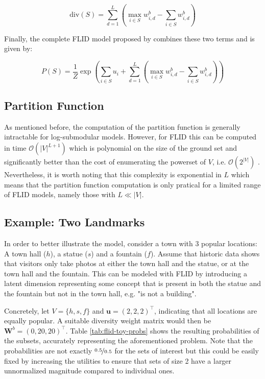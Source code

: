 \begin{equation}
  \label{eq:diversity}
  \mathrm{div}(S) = \sum_{d=1}^{L}\left(\max_{i \in S}{w^{b}_{i, d}} - \sum_{i \in S}{w^{b}_{i,d}}\right)
\end{equation}

Finally, the complete FLID model proposed by \citet{tschiatschek16learning} combines these two terms and is given by:

\begin{equation}
  \tag{FLID}
  P(S) = \frac{1}{Z}\exp{\left(\sum_{i \in S}u_{i} + \sum_{d=1}^{L}\left(\max_{i \in S}{w^{b}_{i, d}} - \sum_{i \in S}{w^{b}_{i,d}}\right)\right)}
  \label{eq:flid}
\end{equation}

\subsection{Partition Function}
\label{sec:flid-z}

As mentioned before, the computation of the partition function is generally intractable for log-submodular models. However, for FLID this can be computed in time $\mathcal{O}(|V|^{L+1})$ which is polynomial on the size of the ground set and significantly better than the cost of enumerating the powerset of $V$, i.e. $\mathcal{O}(2^{|V|})$ \citep{tschiatschek16learning}. Nevertheless, it is worth noting that this complexity is exponential in $L$ which means that the partition function computation is only pratical for a limited range of FLID models, namely those with $L \ll |V|$.

\subsection{Example: Two Landmarks}
\label{sec:flid-toy}

In order to better illustrate the model, consider a town with 3 popular locations: A town hall ($h$), a statue ($s$) and a fountain ($f$). Assume that historic data shows that visitors only take photos at either the town hall and the statue, or at the town hall and the fountain. This can be modeled with FLID by introducing a latent dimension representing some concept that is present in both the statue and the fountain but not in the town hall, e.g. "is not a building".

Concretely, let $V = \{h, s, f\}$ and $\mathbf{u} = \left(2, 2, 2\right)^{\intercal}$, indicating that all locations are equally popular. A suitable diversity weight matrix would then be $\mathbf{W}^{b} = \left(0, 20, 20\right)^{\intercal}$. Table \ref{tab:flid-toy-probs} shows the resulting probabilities of the subsets, accurately representing the aforementioned problem. Note that the probabilities are not exactly $\nicefrac{0.5}{0.5}$ for the sets of interest but this could be easily fixed by increasing the utilities to ensure that sets of size 2 have a larger unnormalized magnitude compared to individual ones.

